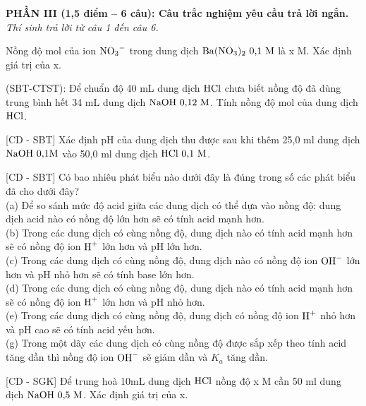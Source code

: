 \documentclass[12pt,a4paper]{article}
\begin{document}
\bigskip
\noindent
\textbf{PHẦN III (1,5 điểm -- 6 câu): Câu trắc nghiệm yêu cầu trả lời ngắn.}\\
\textit{Thí sinh trả lời từ câu 1 đến câu 6.}

\begin{ex}
Nồng độ mol của ion $\ce{NO3-}$ trong dung dịch $\ce{Ba(NO3)2}\ 0{,}1\text{ M}$ là x M. Xác định giá trị của x.
\loigiai{}
\end{ex}

\begin{ex}
(SBT-CTST): Để chuẩn độ 40 mL dung dịch $\ce{HCl}$ chưa biết nồng độ đã dùng trung bình hết 34 mL dung dịch $\ce{NaOH}\ 0{,}12\text{ M}$. Tính nồng độ mol của dung dịch $\ce{HCl}$.
\loigiai{}
\end{ex}

\begin{ex}
{[CD - SBT]} Xác định pH của dung dịch thu được sau khi thêm 25,0 ml dung dịch $\ce{NaOH}\ 0{,}1\text{M}$ vào 50,0 ml dung dịch $\ce{HCl}\ 0{,}1\text{ M}$.
\loigiai{}
\end{ex}

\begin{ex}
{[CD - SBT]} Có bao nhiêu phát biểu nào dưới đây là đúng trong số các phát biểu đã cho dưới đây?\\
(a) Để so sánh mức độ acid giữa các dung dịch có thể dựa vào nồng độ: dung dịch acid nào có nồng độ lớn hơn sẽ có tính acid mạnh hơn.\\
(b) Trong các dung dịch có cùng nồng độ, dung dịch nào có tính acid mạnh hơn sẽ có nồng độ ion $\ce{H+}$ lớn hơn và pH lớn hơn.\\
(c) Trong các dung dịch có cùng nồng độ, dung dịch nào có nồng độ ion $\ce{OH-}$ lớn hơn và pH nhỏ hơn sẽ có tính base lớn hơn.\\
(d) Trong các dung dịch có cùng nồng độ, dung dịch nào có tính acid mạnh hơn sẽ có nồng độ ion $\ce{H+}$ lớn hơn và pH nhỏ hơn.\\
(e) Trong các dung dịch có cùng nồng độ, dung dịch có nồng độ ion $\ce{H+}$ nhỏ hơn và pH cao sẽ có tính acid yếu hơn.\\
(g) Trong một dãy các dung dịch có cùng nồng độ được sắp xếp theo tính acid tăng dần thì nồng độ ion $\ce{OH-}$ sẽ giảm dần và $K_a$ tăng dần.
\loigiai{}
\end{ex}

\begin{ex}
{[CD - SGK]} Để trung hoà 10mL dung dịch $\ce{HCl}$ nồng độ x M cần 50 ml dung dịch $\ce{NaOH}\ 0{,}5\text{ M}$. Xác định giá trị của x.
\loigiai{}
\end{ex}
\end{document}
